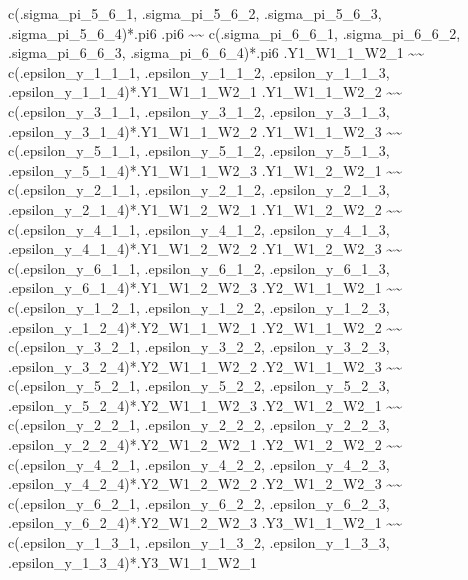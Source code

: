 \documentclass[
]{book}
\newenvironment{Shaded}{\begin{snugshade}}{\end{snugshade}}
\newcommand{\StringTok}[1]{\textcolor[rgb]{0.31,0.60,0.02}{#1}}
\begin{document}
\begin{Shaded}
\begin{Highlighting}[]
\StringTok{    c(.sigma\_pi\_5\_6\_1, .sigma\_pi\_5\_6\_2, .sigma\_pi\_5\_6\_3, .sigma\_pi\_5\_6\_4)*.pi6}
\StringTok{.pi6 \textasciitilde{}\textasciitilde{}}
\StringTok{    c(.sigma\_pi\_6\_6\_1, .sigma\_pi\_6\_6\_2, .sigma\_pi\_6\_6\_3, .sigma\_pi\_6\_6\_4)*.pi6}
\StringTok{.Y1\_W1\_1\_W2\_1 \textasciitilde{}\textasciitilde{}}
\StringTok{    c(.epsilon\_y\_1\_1\_1, .epsilon\_y\_1\_1\_2, .epsilon\_y\_1\_1\_3, .epsilon\_y\_1\_1\_4)*.Y1\_W1\_1\_W2\_1}
\StringTok{.Y1\_W1\_1\_W2\_2 \textasciitilde{}\textasciitilde{}}
\StringTok{    c(.epsilon\_y\_3\_1\_1, .epsilon\_y\_3\_1\_2, .epsilon\_y\_3\_1\_3, .epsilon\_y\_3\_1\_4)*.Y1\_W1\_1\_W2\_2}
\StringTok{.Y1\_W1\_1\_W2\_3 \textasciitilde{}\textasciitilde{}}
\StringTok{    c(.epsilon\_y\_5\_1\_1, .epsilon\_y\_5\_1\_2, .epsilon\_y\_5\_1\_3, .epsilon\_y\_5\_1\_4)*.Y1\_W1\_1\_W2\_3}
\StringTok{.Y1\_W1\_2\_W2\_1 \textasciitilde{}\textasciitilde{}}
\StringTok{    c(.epsilon\_y\_2\_1\_1, .epsilon\_y\_2\_1\_2, .epsilon\_y\_2\_1\_3, .epsilon\_y\_2\_1\_4)*.Y1\_W1\_2\_W2\_1}
\StringTok{.Y1\_W1\_2\_W2\_2 \textasciitilde{}\textasciitilde{}}
\StringTok{    c(.epsilon\_y\_4\_1\_1, .epsilon\_y\_4\_1\_2, .epsilon\_y\_4\_1\_3, .epsilon\_y\_4\_1\_4)*.Y1\_W1\_2\_W2\_2}
\StringTok{.Y1\_W1\_2\_W2\_3 \textasciitilde{}\textasciitilde{}}
\StringTok{    c(.epsilon\_y\_6\_1\_1, .epsilon\_y\_6\_1\_2, .epsilon\_y\_6\_1\_3, .epsilon\_y\_6\_1\_4)*.Y1\_W1\_2\_W2\_3}
\StringTok{.Y2\_W1\_1\_W2\_1 \textasciitilde{}\textasciitilde{}}
\StringTok{    c(.epsilon\_y\_1\_2\_1, .epsilon\_y\_1\_2\_2, .epsilon\_y\_1\_2\_3, .epsilon\_y\_1\_2\_4)*.Y2\_W1\_1\_W2\_1}
\StringTok{.Y2\_W1\_1\_W2\_2 \textasciitilde{}\textasciitilde{}}
\StringTok{    c(.epsilon\_y\_3\_2\_1, .epsilon\_y\_3\_2\_2, .epsilon\_y\_3\_2\_3, .epsilon\_y\_3\_2\_4)*.Y2\_W1\_1\_W2\_2}
\StringTok{.Y2\_W1\_1\_W2\_3 \textasciitilde{}\textasciitilde{}}
\StringTok{    c(.epsilon\_y\_5\_2\_1, .epsilon\_y\_5\_2\_2, .epsilon\_y\_5\_2\_3, .epsilon\_y\_5\_2\_4)*.Y2\_W1\_1\_W2\_3}
\StringTok{.Y2\_W1\_2\_W2\_1 \textasciitilde{}\textasciitilde{}}
\StringTok{    c(.epsilon\_y\_2\_2\_1, .epsilon\_y\_2\_2\_2, .epsilon\_y\_2\_2\_3, .epsilon\_y\_2\_2\_4)*.Y2\_W1\_2\_W2\_1}
\StringTok{.Y2\_W1\_2\_W2\_2 \textasciitilde{}\textasciitilde{}}
\StringTok{    c(.epsilon\_y\_4\_2\_1, .epsilon\_y\_4\_2\_2, .epsilon\_y\_4\_2\_3, .epsilon\_y\_4\_2\_4)*.Y2\_W1\_2\_W2\_2}
\StringTok{.Y2\_W1\_2\_W2\_3 \textasciitilde{}\textasciitilde{}}
\StringTok{    c(.epsilon\_y\_6\_2\_1, .epsilon\_y\_6\_2\_2, .epsilon\_y\_6\_2\_3, .epsilon\_y\_6\_2\_4)*.Y2\_W1\_2\_W2\_3}
\StringTok{.Y3\_W1\_1\_W2\_1 \textasciitilde{}\textasciitilde{}}
\StringTok{    c(.epsilon\_y\_1\_3\_1, .epsilon\_y\_1\_3\_2, .epsilon\_y\_1\_3\_3, .epsilon\_y\_1\_3\_4)*.Y3\_W1\_1\_W2\_1}

\end{Highlighting}
\end{Shaded}
\end{document}
